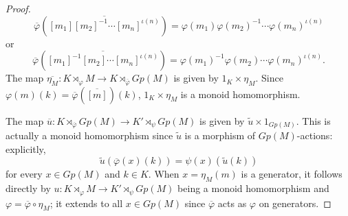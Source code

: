 \begin{lemma}
\begin{proof}
        \[ \overline{\varphi}(\overline{[m_1]{[m_2]}^{-1}\cdots[m_n]^{\iota(n)}}) = \varphi   (m_1){\varphi(m_2)}^{-1}\cdots {\varphi(m_n)}^{\iota(n)} \]
        or
        \[ \overline{\varphi}(\overline{{[m_1]}^{-1}[m_2]\cdots[m_n]^{\iota(n)}}) = {\varphi   (m_1)}^{-1}\varphi(m_2)\cdots {\varphi(m_n)}^{\iota(n)}. \]
        The map $\overline{\eta_M}:K\rtimes_\varphi M\to K\rtimes_{\overline{\varphi}}Gp(M)$ is given by $1_K\times\eta_M$. Since $\varphi(m)(k) = \overline{\varphi}(\overline{[m]})(k)$, $1_K\times\eta_M$ is a monoid homomorphism.

        The map $\overline{u}:K\rtimes_{\overline{\varphi}}Gp(M)\to K'\rtimes_\psi Gp(M)$ is given by $\widetilde{u}\times1_{Gp(M)}$. This is actually a monoid homomorphism since $\widetilde{u}$ is a morphism of $Gp(M)$-actions: explicitly,
        \[ \widetilde{u}(\overline{\varphi}(x)(k)) = \psi(x)(\widetilde{u}(k)) \]
        for every $x\in Gp(M)$ and $k\in K$. When $x=\eta_M(m)$ is a generator, it follows directly by $u:K\rtimes_{\varphi}M\to K'\rtimes_\psi Gp(M)$ being a monoid homomorphism and $\varphi = \overline{\varphi}\circ \eta_M$; it extends to all $x\in Gp(M)$ since $\overline{\varphi}$ acts as $\varphi$ on generators.
    \end{proof}
\end{lemma}

